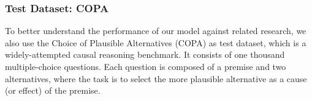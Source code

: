 
\subsubsection{Test Dataset: COPA}
To better understand the performance of our model against related research, we also use 
the Choice of Plausible Alternatives (COPA) 
as test dataset, which is a widely-attempted causal reasoning benchmark. It consists
of one thousand multiple-choice questions.
Each question is composed of a premise and two alternatives,
where the task is to select the more plausible alternative as a
cause (or effect) of the premise. 

